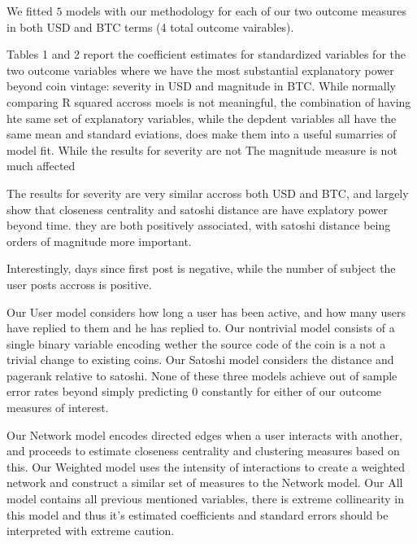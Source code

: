 We fitted $5$ models with our methodology for each of our two outcome measures in both USD and BTC terms (4 total outcome vairables).

Tables 1 and 2 report the coefficient estimates for standardized variables for the two outcome variables where we have the most substantial explanatory power beyond coin vintage: severity in USD and magnitude in BTC. While normally comparing R squared accross moels is not meaningful, the combination of having hte same set of explanatory variables, while the depdent variables all have the same mean and standard eviations, does make them into a useful sumarries of model fit. 
While the results for severity are not The magnitude measure is not much affected





The results for severity are very similar accross both USD and BTC, and largely show that closeness centrality and satoshi distance are have explatory power beyond time. they are both positively associated, with satoshi distance being orders of magnitude more important.

Interestingly, days since first post is negative, while the number of subject the user posts accross is positive.








Our User model considers how long a user has been active, and how many users have replied to them and he has replied to. 
Our nontrivial model consists of a single binary variable encoding wether the source code of the coin is a not a trivial change to existing coins. 
Our Satoshi model considers the distance and pagerank relative to satoshi.
None  of these three models achieve out of sample error rates beyond simply predicting $0$ constantly for either of our outcome measures of interest.

Our Network model encodes directed edges when a user interacts with another, and proceeds to estimate closeness centrality and clustering measures based on this. 
Our Weighted model uses the intensity of interactions to create a weighted network and construct a similar set of measures to the Network model.
Our All model contains all previous mentioned variables, there is extreme collinearity in this model and thus it's estimated coefficients and standard errors should be interpreted with extreme caution. 






